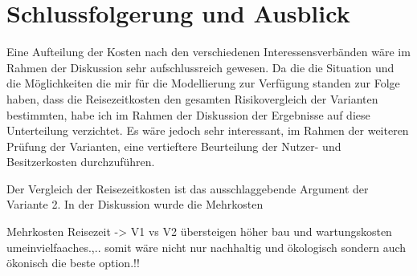 %
%
%
%

\chapter{Schlussfolgerung und Ausblick}
\label{chap:Schlussfolgerung}



Eine Aufteilung der Kosten nach den verschiedenen Interessensverbänden wäre im Rahmen der Diskussion sehr aufschlussreich gewesen. Da die die Situation und die Möglichkeiten die mir für die Modellierung zur Verfügung standen zur Folge haben, dass die Reisezeitkosten den gesamten Risikovergleich der Varianten bestimmten, habe ich im Rahmen der Diskussion der Ergebnisse auf diese Unterteilung verzichtet. Es wäre jedoch sehr interessant, im Rahmen der weiteren Prüfung der Varianten, eine vertieftere Beurteilung der Nutzer- und Besitzerkosten durchzuführen.

Der Vergleich der Reisezeitkosten ist das ausschlaggebende Argument der Variante 2. In der Diskussion wurde die Mehrkosten

Mehrkosten Reisezeit -> V1 vs V2 übersteigen höher bau und wartungskosten umeinvielfaaches.,.. somit wäre nicht nur nachhaltig und ökologisch sondern auch ökonisch die beste option.!! 




